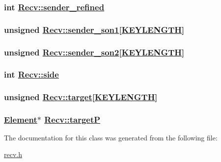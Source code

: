 \hypertarget{classRecv_o7}{
\subsubsection[sender\_\-refined]{\setlength{\rightskip}{0pt plus 5cm}int \hyperlink{classRecv_o7}{Recv::sender\_\-refined}}}
\label{classRecv_o7}


\hypertarget{classRecv_o3}{
\subsubsection[sender\_\-son1]{\setlength{\rightskip}{0pt plus 5cm}unsigned \hyperlink{classRecv_o3}{Recv::sender\_\-son1}\mbox{[}\hyperlink{constant_8h_a10}{KEYLENGTH}\mbox{]}}}
\label{classRecv_o3}


\hypertarget{classRecv_o4}{
\subsubsection[sender\_\-son2]{\setlength{\rightskip}{0pt plus 5cm}unsigned \hyperlink{classRecv_o4}{Recv::sender\_\-son2}\mbox{[}\hyperlink{constant_8h_a10}{KEYLENGTH}\mbox{]}}}
\label{classRecv_o4}


\hypertarget{classRecv_o8}{
\subsubsection[side]{\setlength{\rightskip}{0pt plus 5cm}int \hyperlink{classRecv_o8}{Recv::side}}}
\label{classRecv_o8}


\hypertarget{classRecv_o2}{
\subsubsection[target]{\setlength{\rightskip}{0pt plus 5cm}unsigned \hyperlink{classRecv_o2}{Recv::target}\mbox{[}\hyperlink{constant_8h_a10}{KEYLENGTH}\mbox{]}}}
\label{classRecv_o2}


\hypertarget{classRecv_o0}{
\subsubsection[targetP]{\setlength{\rightskip}{0pt plus 5cm}\hyperlink{classElement}{Element}$\ast$ \hyperlink{classRecv_o0}{Recv::target\-P}}}
\label{classRecv_o0}




The documentation for this class was generated from the following file:\begin{CompactItemize}
\item 
\hyperlink{recv_8h}{recv.h}\end{CompactItemize}
